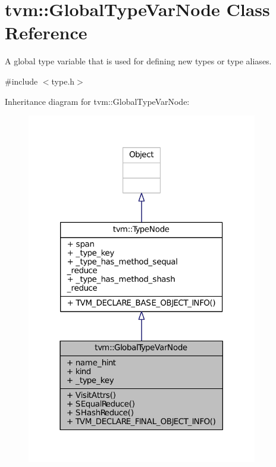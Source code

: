 \hypertarget{classtvm_1_1GlobalTypeVarNode}{}\section{tvm\+:\+:Global\+Type\+Var\+Node Class Reference}
\label{classtvm_1_1GlobalTypeVarNode}


A global type variable that is used for defining new types or type aliases.  




{\ttfamily \#include $<$type.\+h$>$}



Inheritance diagram for tvm\+:\+:Global\+Type\+Var\+Node\+:
\nopagebreak
\begin{figure}[H]
\begin{center}
\leavevmode
\includegraphics[width=285pt]{classtvm_1_1GlobalTypeVarNode__inherit__graph}
\end{center}
\end{figure}


